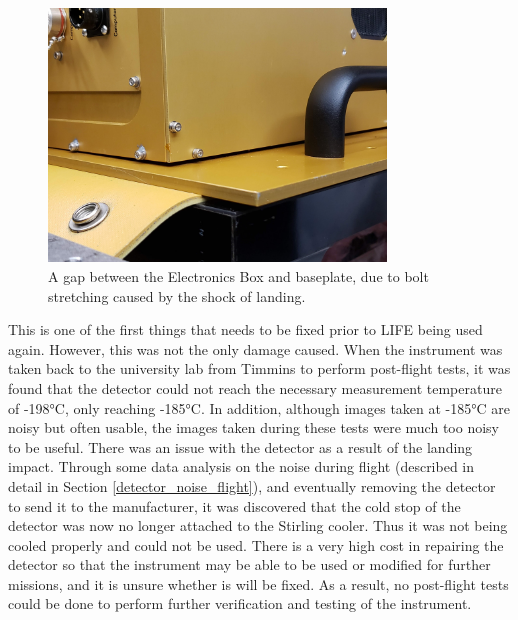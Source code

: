 \begin{figure}
    \centering
    \includegraphics[width=0.8\textwidth]{chap4_images/LIFE_impact_result.jpg}
    \caption{A gap between the Electronics Box and baseplate, due to bolt stretching caused by the shock of landing.}
    \label{fig:landing_damage_image}
\end{figure}

This is one of the first things that needs to be fixed prior to LIFE being used again. However, this was not the only damage caused. When the instrument was taken back to the university lab from Timmins to perform post-flight tests, it was found that the detector could not reach the necessary measurement temperature of -198°C, only reaching -185°C. In addition, although images taken at -185°C are noisy but often usable, the images taken during these tests were much too noisy to be useful. There was an issue with the detector as a result of the landing impact. Through some data analysis on the noise during flight (described in detail in Section \ref{detector_noise_flight}), and eventually removing the detector to send it to the manufacturer, it was discovered that the cold stop of the detector was now no longer attached to the Stirling cooler. Thus it was not being cooled properly and could not be used. There is a very high cost in repairing the detector so that the instrument may be able to be used or modified for further missions, and it is unsure whether is will be fixed. As a result, no post-flight tests could be done to perform further verification and testing of the instrument.

